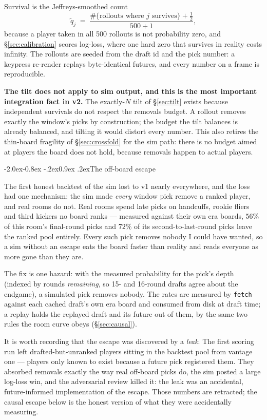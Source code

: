 \documentclass[10pt,a4paper]{article}
\makeatletter
\theoremstyle{plain}
\theoremstyle{definition}
\theoremstyle{remark}
\newcommand{\code}[1]{\texttt{\small #1}}
\renewcommand\subsection{\@startsection{subsection}{2}{\z@}%
  {-2.0ex\@plus -0.8ex \@minus -.2ex}{0.9ex \@plus .2ex}{\normalfont\large\bfseries}}
\makeatother
\begin{document}
Survival is the Jeffreys-smoothed count
\[
  \tilde q_j \;=\; \frac{\#\{\text{rollouts where } j \text{ survives}\} + \tfrac12}{500 + 1},
\]
because a player taken in all 500 rollouts is not probability zero, and
\S\ref{sec:calibration} scores log-loss, where one hard zero that survives in reality
costs infinity. The rollouts are seeded from the draft id and the pick number: a keypress
re-render replays byte-identical futures, and every number on a frame is reproducible.

\textbf{The tilt does not apply to sim output, and this is the most important integration
fact in v2.} The exactly-$N$ tilt of \S\ref{sec:tilt} exists because independent survivals
do not respect the removals budget. A rollout removes exactly the window's picks by
construction; the budget the tilt balances is already balanced, and tilting it would
distort every number. This also retires the thin-board fragility of
\S\ref{sec:crossfold} for the sim path: there is no budget aimed at players the board
does not hold, because removals happen to actual players.

\subsection{The off-board escape}
\label{sec:escape}

The first honest backtest of the sim lost to v1 nearly everywhere, and the loss had one
mechanism: the sim made \emph{every} window pick remove a ranked player, and real rooms do
not. Real rooms spend late picks on handcuffs, rookie fliers and third kickers no board
ranks --- measured against their own era boards, $56\%$ of this room's final-round picks
and $72\%$ of its second-to-last-round picks leave the ranked pool entirely. Every such
pick removes nobody I could have wanted, so a sim without an escape eats the board faster
than reality and reads everyone as more gone than they are.

The fix is one hazard: with the measured probability for the pick's depth (indexed by
rounds \emph{remaining}, so 15- and 16-round drafts agree about the endgame), a simulated
pick removes nobody. The rates are measured by \code{fetch} against each cached draft's own
era board and consumed from disk at draft time; a replay holds the replayed draft and its
future out of them, by the same two rules the room curve obeys (\S\ref{sec:causal}).

It is worth recording that the escape was discovered by a \emph{leak}. The first scoring
run left drafted-but-unranked players sitting in the backtest pool from vantage one ---
players only known to exist because a future pick registered them. They absorbed removals
exactly the way real off-board picks do, the sim posted a large log-loss win, and the
adversarial review killed it: the leak was an accidental, future-informed implementation of
the escape. Those numbers are retracted; the causal escape below is the honest version of
what they were accidentally measuring.
\end{document}
